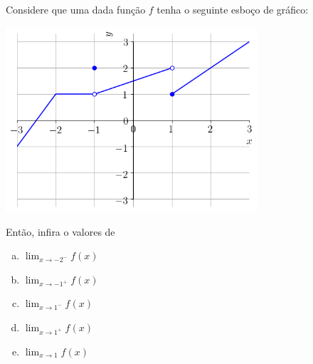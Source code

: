 \begin{exeresol}
  Considere que uma dada função $f$ tenha o seguinte esboço de gráfico:

  \begin{center}
    \includegraphics[width=0.7\textwidth]{./cap_lim/dados/fig_exeresol_nocaolim/fig_exeresol_nocaolim}
  \end{center}

  Então, infira o valores de
  \begin{enumerate}[a)]
  \item $\displaystyle \lim_{x\to -2^-} f(x)$
  \item $\displaystyle \lim_{x\to -1^+} f(x)$
  \item $\displaystyle \lim_{x\to 1^-} f(x)$
  \item $\displaystyle \lim_{x\to 1^+} f(x)$
  \item $\displaystyle \lim_{x\to 1} f(x)$
  \end{enumerate}
\end{exeresol}
